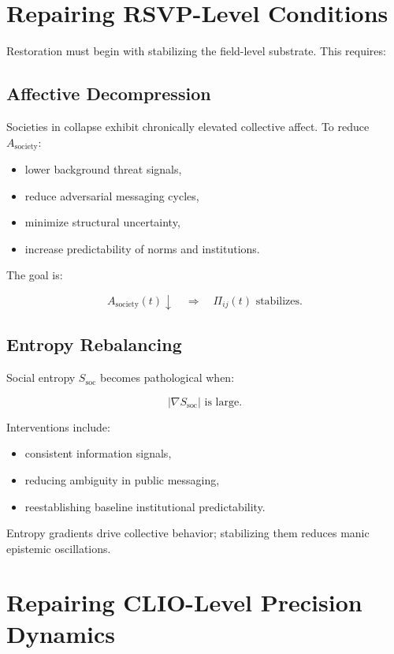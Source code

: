 \documentclass[12pt,oneside]{book}
\theoremstyle{plain}
\theoremstyle{definition}
\begin{document}
\section{Repairing RSVP-Level Conditions}

Restoration must begin with stabilizing the field-level substrate.  
This requires:

\subsection{Affective Decompression}

Societies in collapse exhibit chronically elevated collective affect.  
To reduce $A_{\mathrm{society}}$:

\begin{itemize}
    \item lower background threat signals,
    \item reduce adversarial messaging cycles,
    \item minimize structural uncertainty,
    \item increase predictability of norms and institutions.
\end{itemize}

The goal is:

\[
A_{\mathrm{society}}(t) \downarrow
\quad\Longrightarrow\quad
\Pi_{ij}(t) \text{ stabilizes}.
\]

\subsection{Entropy Rebalancing}

Social entropy $S_{\mathrm{soc}}$ becomes pathological when:

\[
\lvert \nabla S_{\mathrm{soc}} \rvert \text{ is large}.
\]

Interventions include:

\begin{itemize}
    \item consistent information signals,
    \item reducing ambiguity in public messaging,
    \item reestablishing baseline institutional predictability.
\end{itemize}

Entropy gradients drive collective behavior;  
stabilizing them reduces manic epistemic oscillations.

\section{Repairing CLIO-Level Precision Dynamics}
\end{document}
